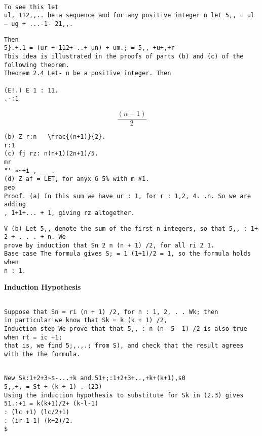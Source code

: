 \documentclass[]{article}
\begin{document}
\begin{verbatim}

To see this let
ul, 112,,.. be a sequence and for any positive integer n let 5,, = ul — ug + ...-1- 21,,.
\end{verbatim}
\begin{verbatim}
Then
5}.+.1 = (ur + 112+-..+ un) + um.; = 5,, +u+,+r-
Tbis idea is illustrated in the proofs of parts (b) and (c) of the following theorem.
Theorem 2.4 Let- n be a positive integer. Then
 
(E!.) E 1 : 11.
.-:1
\end{verbatim}
\[\frac{(n+1)}{2}\]
\begin{verbatim} 
(b) Z r:n   \frac{(n+1)}{2}.
r:1
(c) fj rz: n(n+1)(2n+1)/5.
mr
"‘ »~+i_, __ .
(d) Z af = LET, for anyx G 5% with m #1.
peo
Proof. (a) In this sum we have ur : 1, for r : 1,2, 4. .n. So we are adding
, 1+1+... + 1, giving rz altogether.
\end{verbatim}
\begin{verbatim}
V (b) Let 5,, denote the sum of the first n integers, so that 5,, : 1+ 2 + . . . + n. We
prove by induction that Sn 2 n (n + 1) /2, for all ri 2 1.
Base case The formula gives S; = 1 (1+1)/2 = 1, so the formula holds when
n : 1.
\end{verbatim}
\textbf{Induction Hypothesis}
\begin{verbatim}

Suppose that Sn = ri (n + 1) /2, for n : 1, 2, . . Wk; then
in particular we know that Sk = k (k + 1) /2,
Induction step We prove that that 5,, : n (n -5- 1) /2 is also true when rt = ic +1;
that is, we find 5;,.,.; from S), and check that the result agrees with the the formula.
\end{verbatim}
\begin{verbatim}

New Sk:1+2+3~$-...+k and.51+;:1+2+3+..,+k+(k+1),s0
5,,+, = St + (k + 1) . (23)
Using the induction hypothesis to substitute for Sk in (2.3) gives
51.:+1 = k(k+1)/2+ (k-l-1)
: (lc +1) (lc/2+1)
: (ir-1-1) (k+2)/2.
$
\end{verbatim}

\end{document}
